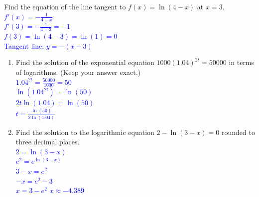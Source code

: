 \documentclass{ximera}
\begin{document}
\begin{exercise}
    Find the equation of the line tangent to $f(x)=\ln(4-x)$ at $x=3$.\\
    \textcolor{blue}{$f'(x)=-\frac{1}{4-x}$\\
    $f'(3)=-\frac{1}{4-3}=-1$\\
    $f(3)=\ln(4-3)=\ln(1)=0$\\
    Tangent line: $y=-(x-3)$}
\end{exercise}
    

\begin{exercise}
    \begin{enumerate}
        \item Find the solution of the exponential equation $1000(1.04)^{2t}=50000$ in terms of logarithms. (Keep your answer exact.)\\
        \textcolor{blue}{$1.04^{2t}=\frac{50000}{1000}=50$\\
        $\ln(1.04^{2t})=\ln(50)$\\
        $2t\ln(1.04)=\ln(50)$\\
        $t=\frac{\ln(50)}{2\ln(1.04)}$}
        \item Find the solution to the logarithmic equation $2-\ln(3-x)=0$ rounded to three decimal places.\\
        \textcolor{blue}{$2=\ln(3-x)$\\
        $e^{2}=e^{\ln(3-x)}$\\
        $3-x=e^{2}$\\
        $-x=e^{2}-3$\\
        $x=3-e^{2}$
        $x\approx -4.389$}
    \end{enumerate}
    
\end{exercise}
\end{document}
